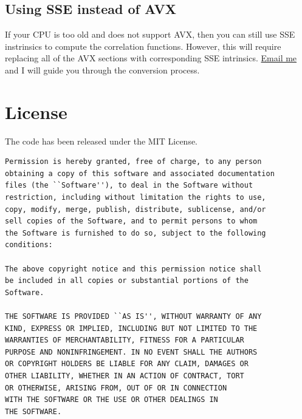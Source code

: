 \documentclass[12pt,titlepage]{article}
\begin{document}
\subsection{Using SSE instead of AVX}
If your CPU is too old and does not support AVX, then you can still use SSE instrinsics to compute the correlation functions. However, this will require replacing all of the 
AVX sections with corresponding SSE intrinsics. \href{mailto:manodeep@gmail.com}{Email me} and I will guide you through the conversion process. 


\section{License}
The code has been released under the MIT License. 
\begin{verbatim}
Permission is hereby granted, free of charge, to any person 
obtaining a copy of this software and associated documentation 
files (the ``Software''), to deal in the Software without 
restriction, including without limitation the rights to use, 
copy, modify, merge, publish, distribute, sublicense, and/or
sell copies of the Software, and to permit persons to whom 
the Software is furnished to do so, subject to the following 
conditions:

The above copyright notice and this permission notice shall 
be included in all copies or substantial portions of the 
Software.

THE SOFTWARE IS PROVIDED ``AS IS'', WITHOUT WARRANTY OF ANY 
KIND, EXPRESS OR IMPLIED, INCLUDING BUT NOT LIMITED TO THE 
WARRANTIES OF MERCHANTABILITY, FITNESS FOR A PARTICULAR 
PURPOSE AND NONINFRINGEMENT. IN NO EVENT SHALL THE AUTHORS 
OR COPYRIGHT HOLDERS BE LIABLE FOR ANY CLAIM, DAMAGES OR 
OTHER LIABILITY, WHETHER IN AN ACTION OF CONTRACT, TORT 
OR OTHERWISE, ARISING FROM, OUT OF OR IN CONNECTION 
WITH THE SOFTWARE OR THE USE OR OTHER DEALINGS IN 
THE SOFTWARE.
\end{verbatim}
\end{document}
